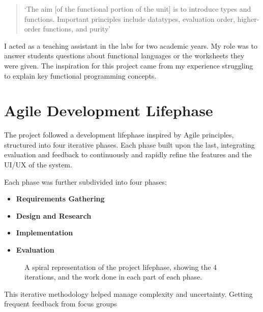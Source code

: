 \begin{quote}
`The aim [of the functional portion of the unit] is to introduce types and functions. Important principles include datatypes, evaluation order, higher-order functions, and purity' \cite{COMS10016}
\end{quote}

\noindent I acted as a teaching assistant in the labs for two academic years. My role was to answer students questions about functional languages or the worksheets they were given. The inspiration for this project came from my experience struggling to explain key functional programming concepts. 

\section{Agile Development Lifephase}
The project followed a development lifephase inspired by Agile principles\cite{agilemanifesto2001}, structured into four iterative phases. Each phase built upon the last, integrating evaluation and feedback to continuously and rapidly refine the features and the UI/UX of the system. 

Each phase was further subdivided into four phases:

\begin{itemize}
    \item \textbf{Requirements Gathering}
    \item \textbf{Design and Research}
    \item \textbf{Implementation}
    \item \textbf{Evaluation}
\end{itemize}

\begin{figure}[t]
    \centering
    \caption{A spiral representation of the project lifephase, showing the 4 iterations, and the work done in each part of each phase. }\label{fig:spiral}
\end{figure}

This iterative methodology helped manage complexity and uncertainty. Getting frequent feedback from focus groups 